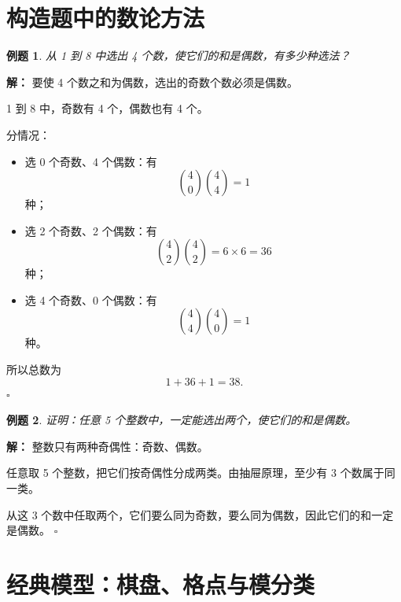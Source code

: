 \documentclass[11pt,a4paper,fontset=fandol]{ctexart}
\theoremstyle{formaltheorem}
\theoremstyle{formalexample}
\newtheorem{example}{例题}[section]
\newenvironment{solution}{\par\noindent\textbf{解：}}{\hfill$\square$\par}
\begin{document}
\section{构造题中的数论方法}

\begin{example}
从 1 到 8 中选出 4 个数，使它们的和是偶数，有多少种选法？
\end{example}

\begin{solution}
要使 4 个数之和为偶数，选出的奇数个数必须是偶数。

1 到 8 中，奇数有 4 个，偶数也有 4 个。

分情况：
\begin{itemize}
  \item 选 0 个奇数、4 个偶数：有
  \[
  \binom40\binom44=1
  \]
  种；
  \item 选 2 个奇数、2 个偶数：有
  \[
  \binom42\binom42=6\times 6=36
  \]
  种；
  \item 选 4 个奇数、0 个偶数：有
  \[
  \binom44\binom40=1
  \]
  种。
\end{itemize}

所以总数为
\[
1+36+1=38.
\]
\end{solution}

\begin{example}
证明：任意 5 个整数中，一定能选出两个，使它们的和是偶数。
\end{example}

\begin{solution}
整数只有两种奇偶性：奇数、偶数。

任意取 5 个整数，把它们按奇偶性分成两类。由抽屉原理，至少有 3 个数属于同一类。

从这 3 个数中任取两个，它们要么同为奇数，要么同为偶数，因此它们的和一定是偶数。
\end{solution}

\section{经典模型：棋盘、格点与模分类}

\begin{center}
\end{center}
\end{document}
